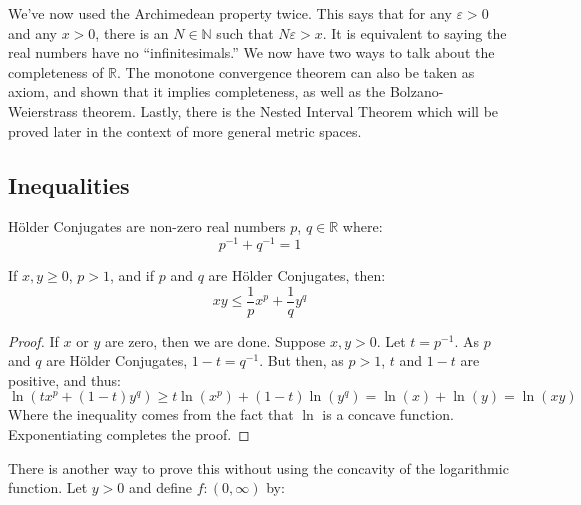         We've now used the Archimedean property twice. This
        says that for any $\varepsilon>0$ and any
        $x>0$, there is an $N\in\mathbb{N}$ such that
        $N\varepsilon>x$. It is equivalent to saying the
        real numbers have no ``infinitesimals.'' We now
        have two ways to talk about the completeness of
        $\mathbb{R}$. The monotone convergence theorem
        can also be taken as axiom, and shown that it
        implies completeness, as well as the
        Bolzano-Weierstrass theorem. Lastly, there is the
        Nested Interval Theorem which will be proved later
        in the context of more general metric spaces.
    \subsection{Inequalities}
        \begin{definition}
            H\"{o}lder Conjugates are non-zero real numbers
            $p$, $q\in\mathbb{R}$ where:
            \begin{equation}
                p^{-1}+q^{-1}=1
            \end{equation}
        \end{definition}
        \begin{theorem}
            If $x,y\geq{0}$, $p>1$, and if $p$ and $q$
            are H\"{o}lder Conjugates, then:
            \begin{equation}
                xy\leq{\frac{1}{p}x^{p}+\frac{1}{q}y^{q}}
            \end{equation}
        \end{theorem}
        \begin{proof}
            If $x$ or $y$ are zero, then we are done.
            Suppose $x,y>0$. Let $t=p^{-1}$. As $p$ and
            $q$ are H\"{o}lder Conjugates,
            $1-t=q^{-1}$. But then, as $p>1$,
            $t$ and $1-t$ are positive, and thus:
            \begin{equation}
                \ln(tx^{p}+(1-t)y^{q})
                \geq{t}\ln(x^{p})+(1-t)\ln(y^{q})
                =\ln(x)+\ln(y)=\ln(xy)
            \end{equation}
            Where the inequality comes from the fact
            that $\ln$ is a concave function.
            Exponentiating completes the proof.
        \end{proof}
        There is another way to prove this without using
        the concavity of the logarithmic function.
        Let $y>0$ and define $f:(0,\infty)$ by:
